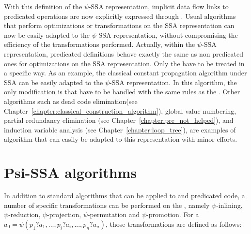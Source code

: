 With this definition of the $\psi$-SSA representation, implicit data flow links to predicated operations are now explicitly expressed through \psifuns. Usual algorithms that perform
optimizations or transformations on the SSA representation can now be
easily adapted to the $\psi$-SSA representation, without compromising
the efficiency of the transformations performed. Actually, within the
$\psi$-SSA representation, predicated definitions behave exactly the
same as non predicated ones for optimizations on the SSA
representation. Only the \psifuns have to be treated in a
specific way. As an example, the classical constant propagation
algorithm under SSA can be easily adapted to the $\psi$-SSA
representation. In this algorithm, the only modification is that
\psifuns have to be handled with the same rules as the \phifuns. Other algorithms such as dead code elimination(see Chapter~\ref{chapter:classical_construction_algorithm}), global
value numbering, partial redundancy elimination (see Chapter~\ref{chapter:pre_not_helped}), and induction
variable analysis (see Chapter~\ref{chapter:loop_tree}), are examples of algorithm that can easily be adapted
to this representation with minor efforts.

\section{Psi-SSA algorithms}



In addition to standard algorithms that can be applied to \psifuns and predicated code, a number of specific transformations
can be performed on the \psifuns, namely $\psi$-inlining,
$\psi$-reduction, $\psi$-projection, $\psi$-permutation and
$\psi$-promotion. For a \psifun ${a_0 = \psi(p_1?a_1, ...,
  p_i?a_i, ..., p_n?a_n)}$, those transformations are defined as
follows:

